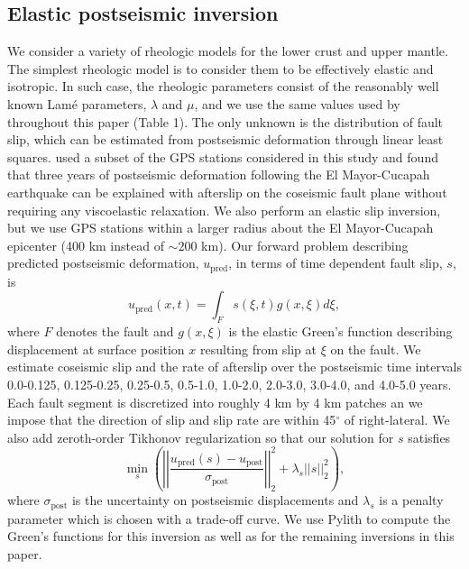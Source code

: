 \subsection{Elastic postseismic inversion}\label{ch3:sec:ElasticInversion}    
We consider a variety of rheologic models for the lower crust and upper mantle. The simplest rheologic model is to consider them to be effectively elastic and isotropic.  In such case, the rheologic parameters consist of the reasonably well known Lam\'e parameters, $\lambda$ and $\mu$, and we use the same values used by \citet{Wei2011} throughout this paper (Table 1).  The only unknown is the distribution of fault slip, which can be estimated from postseismic deformation through linear least squares.  \citet{Rollins2015} used a subset of the GPS stations considered in this study and found that three years of postseismic deformation following the El Mayor-Cucapah earthquake can be explained with afterslip on the coseismic fault plane without requiring any viscoelastic relaxation. We also perform an elastic slip inversion, but we use GPS stations within a larger radius about the El Mayor-Cucapah epicenter (400 km instead of ${\sim}200$ km). Our forward problem describing predicted postseismic deformation, $u_\mathrm{pred}$, in terms of time dependent fault slip, $s$, is
\begin{equation}\label{ch3:eq:ElasticForward}
  u_\mathrm{pred}(x,t) = \int_F s(\xi,t)g(x,\xi)d\xi, 
\end{equation}           
where $F$ denotes the fault and $g(x,\xi)$ is the elastic Green's function describing displacement at surface position $x$ resulting from slip at $\xi$ on the fault.  We estimate coseismic slip and the rate of afterslip over the postseismic time intervals 0.0-0.125, 0.125-0.25, 0.25-0.5, 0.5-1.0, 1.0-2.0, 2.0-3.0, 3.0-4.0, and 4.0-5.0 years.  Each fault segment is discretized into roughly 4 km by 4 km patches an we impose that the direction of slip and slip rate are within 45$^\circ$ of right-lateral. We also add zeroth-order Tikhonov regularization so that our solution for $s$ satisfies
\begin{equation}\label{ch3:eq:ElasticObjective}
  \min_s \left(\left|\left|\frac{u_\mathrm{pred}(s) - u_\mathrm{post}}                
                                {\sigma_\mathrm{post}}\right|\right|_2^2 + 
                                \lambda_s||s||_2^2\right),
\end{equation}
where $\sigma_\mathrm{post}$ is the uncertainty on postseismic displacements and $\lambda_s$ is a penalty parameter which is chosen with a trade-off curve.  We use Pylith \citep{Aagaard2013} to compute the Green's functions for this inversion as well as for the remaining inversions in this paper. 

